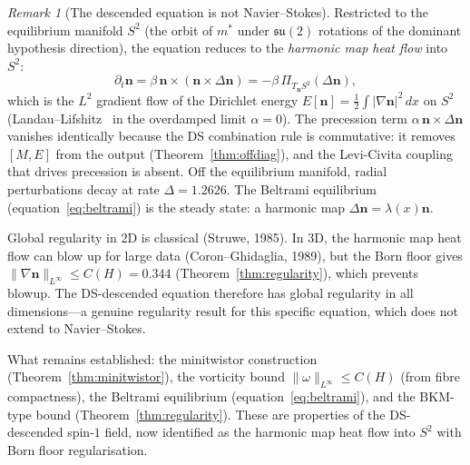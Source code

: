 \documentclass[11pt,a4paper]{article}
\theoremstyle{definition}
\theoremstyle{remark}
\newtheorem{remark}[theorem]{Remark}
\newcommand{\su}{\mathfrak{su}}
\begin{document}
\begin{remark}[The descended equation is not Navier--Stokes]
Restricted to the equilibrium manifold $S^2$ (the orbit of $m^*$ under $\su(2)$ rotations of the dominant hypothesis direction), the equation reduces to the \emph{harmonic map heat flow} into $S^2$:
\begin{equation}\label{eq:hmhf}
\partial_t\mathbf{n}=\beta\,\mathbf{n}\times(\mathbf{n}\times\Delta\mathbf{n})=-\beta\,\Pi_{T_{\mathbf{n}}S^2}(\Delta\mathbf{n}),
\end{equation}
which is the $L^2$ gradient flow of the Dirichlet energy $E[\mathbf{n}]=\frac{1}{2}\int|\nabla\mathbf{n}|^2\,dx$ on $S^2$ (Landau--Lifshitz~\cite{LandauLifshitz1935} in the overdamped limit $\alpha=0$). The precession term $\alpha\,\mathbf{n}\times\Delta\mathbf{n}$ vanishes identically because the DS combination rule is commutative: it removes $[M,E]$ from the output (Theorem~\ref{thm:offdiag}), and the Levi-Civita coupling that drives precession is absent. Off the equilibrium manifold, radial perturbations decay at rate $\Delta=1.2626$. The Beltrami equilibrium (equation~\ref{eq:beltrami}) is the steady state: a harmonic map $\Delta\mathbf{n}=\lambda(x)\mathbf{n}$.

Global regularity in $2$D is classical (Struwe, 1985). In $3$D, the harmonic map heat flow can blow up for large data (Coron--Ghidaglia, 1989), but the Born floor gives $\|\nabla\mathbf{n}\|_{L^\infty}\leq C(H)=0.344$ (Theorem~\ref{thm:regularity}), which prevents blowup. The DS-descended equation therefore has global regularity in all dimensions---a genuine regularity result for this specific equation, which does not extend to Navier--Stokes.

What remains established: the minitwistor construction (Theorem~\ref{thm:minitwistor}), the vorticity bound $\|\omega\|_{L^\infty}\leq C(H)$ (from fibre compactness), the Beltrami equilibrium (equation~\ref{eq:beltrami}), and the BKM-type bound (Theorem~\ref{thm:regularity}). These are properties of the DS-descended spin-$1$ field, now identified as the harmonic map heat flow into $S^2$ with Born floor regularisation.


\end{remark}
\end{document}
